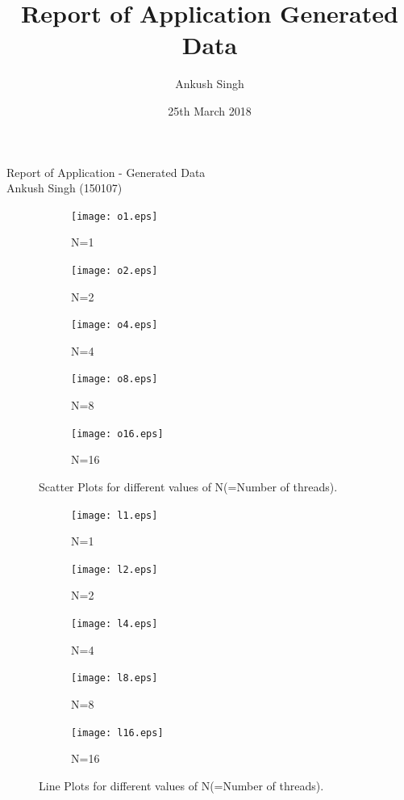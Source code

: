 \documentclass[a4paper, 10pt]{report}
\title{Report of Application Generated Data}
\author{Ankush Singh}
\date{25th March 2018}
\begin{document}
\centering
\text
{\Large Report of Application - Generated Data}\\
\vspace{0.5pc}
{\Large Ankush Singh (150107)}\\
\hline \hline

\begin{figure}[h]
\centering
\begin{subfigure}{0.41\linewidth}
\texttt{[image: o1.eps]}
 \caption{N=1}
 \label{fig:part1}
\end{subfigure} \hfill
%
\begin{subfigure}{0.41\linewidth}
\texttt{[image: o2.eps]}
 \caption{N=2}
 \label{fig:part2}
\end{subfigure} \hfill
%

\centering
\begin{subfigure}{0.41\linewidth}
\texttt{[image: o4.eps]}
 \caption{N=4}
 \label{fig:part1}
\end{subfigure} \hfill
%
\begin{subfigure}{0.41\linewidth}
\texttt{[image: o8.eps]}
 \caption{N=8}
 \label{fig:part2}
\end{subfigure} \hfill
%
\centering
\begin{subfigure}{0.41\linewidth}
\texttt{[image: o16.eps]}
 \caption{N=16}
 \label{fig:part1}
\end{subfigure} \hfill
\caption{Scatter Plots for different values of N(=Number of threads).}
\label{fig:composite}
\end{figure}

\begin{figure}
\centering
\begin{subfigure}{0.41\linewidth}
\texttt{[image: l1.eps]}
 \caption{N=1}
 \label{fig:part1}
\end{subfigure} \hfill
%
\begin{subfigure}{0.41\linewidth}
\texttt{[image: l2.eps]}
 \caption{N=2}
 \label{fig:part2}
\end{subfigure} \hfill
%

\centering
\begin{subfigure}{0.41\linewidth}
\texttt{[image: l4.eps]}
 \caption{N=4}
 \label{fig:part1}
\end{subfigure} \hfill
%
\begin{subfigure}{0.41\linewidth}
\texttt{[image: l8.eps]}
 \caption{N=8}
 \label{fig:part2}
\end{subfigure} \hfill
%
\centering
\begin{subfigure}{0.41\linewidth}
\texttt{[image: l16.eps]}
 \caption{N=16}
 \label{fig:part1}
\end{subfigure} \hfill
\caption{Line Plots for different values of N(=Number of threads).}
\label{fig:composite}
\end{figure}
\end{document}
